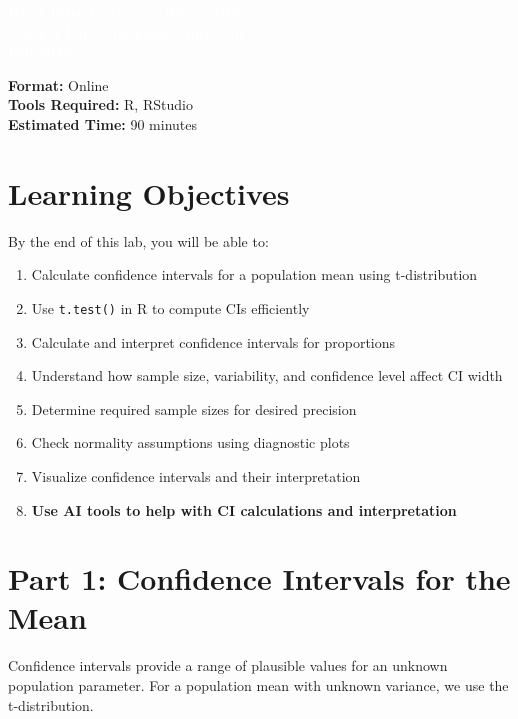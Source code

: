 \documentclass[11pt]{article}
\title{}
\author{}
\date{}
\begin{document}
\begin{tcolorbox}[colback=osaorange,colframe=black,boxrule=2pt,arc=0pt,left=3pt,right=3pt,top=6pt,bottom=6pt,boxsep=2pt]
\centering
\textcolor{white}{\textbf{\Large H524 Introduction to Biostatistics}}\\
\textcolor{white}{\textbf{\Large Week 4 Lab: Confidence Intervals}}\\
\textcolor{white}{\textbf{\Large Fall 2025}}
\end{tcolorbox}

\vspace{8pt}

\noindent\textbf{Format:} Online\\
\textbf{Tools Required:} R, RStudio\\
\textbf{Estimated Time:} 90 minutes

\section{Learning Objectives}

By the end of this lab, you will be able to:
\begin{enumerate}
\item Calculate confidence intervals for a population mean using t-distribution
\item Use \texttt{t.test()} in R to compute CIs efficiently
\item Calculate and interpret confidence intervals for proportions
\item Understand how sample size, variability, and confidence level affect CI width
\item Determine required sample sizes for desired precision
\item Check normality assumptions using diagnostic plots
\item Visualize confidence intervals and their interpretation
\item \textcolor{aiblue}{\textbf{Use AI tools to help with CI calculations and interpretation}}
\end{enumerate}

\section{Part 1: Confidence Intervals for the Mean}

Confidence intervals provide a range of plausible values for an unknown population parameter. For a population mean with unknown variance, we use the t-distribution.
\end{document}
